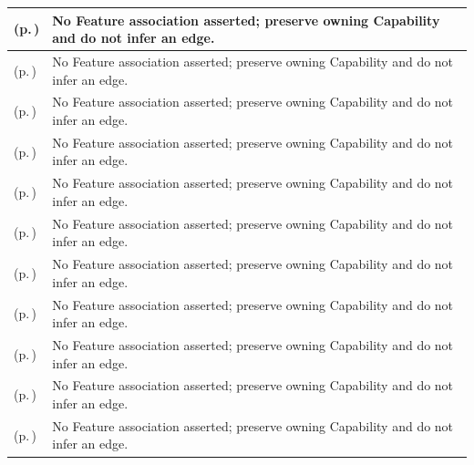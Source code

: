 \begin{longtable}{|>{\raggedright\arraybackslash}p{0.38\TableWidth}|>{\raggedright\arraybackslash}p{0.62\TableWidth}|}
\nameref{function:govern-information-definition} (p.\,\pageref{function:govern-information-definition}) & No Feature association asserted; preserve owning Capability and do not infer an edge.\\\hline
\nameref{service:information-dictionary-query} (p.\,\pageref{service:information-dictionary-query}) & No Feature association asserted; preserve owning Capability and do not infer an edge.\\\hline
\nameref{function:govern-terminology-binding} (p.\,\pageref{function:govern-terminology-binding}) & No Feature association asserted; preserve owning Capability and do not infer an edge.\\\hline
\nameref{service:terminology-binding-specification-lookup} (p.\,\pageref{service:terminology-binding-specification-lookup}) & No Feature association asserted; preserve owning Capability and do not infer an edge.\\\hline
\nameref{function:govern-exchange-profile} (p.\,\pageref{function:govern-exchange-profile}) & No Feature association asserted; preserve owning Capability and do not infer an edge.\\\hline
\nameref{service:exchange-profile-specification-query} (p.\,\pageref{service:exchange-profile-specification-query}) & No Feature association asserted; preserve owning Capability and do not infer an edge.\\\hline
\nameref{function:design-service-assurance} (p.\,\pageref{function:design-service-assurance}) & No Feature association asserted; preserve owning Capability and do not infer an edge.\\\hline
\nameref{function:manage-assurance-criteria} (p.\,\pageref{function:manage-assurance-criteria}) & No Feature association asserted; preserve owning Capability and do not infer an edge.\\\hline
\nameref{function:establish-assurance-context} (p.\,\pageref{function:establish-assurance-context}) & No Feature association asserted; preserve owning Capability and do not infer an edge.\\\hline
\nameref{function:assess-assurance-evidence} (p.\,\pageref{function:assess-assurance-evidence}) & No Feature association asserted; preserve owning Capability and do not infer an edge.\\\hline
\nameref{function:adjudicate-assurance-assessment} (p.\,\pageref{function:adjudicate-assurance-assessment}) & No Feature association asserted; preserve owning Capability and do not infer an edge.\\\hline

\end{longtable}
